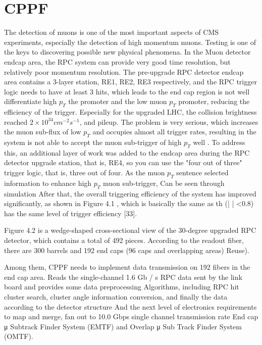 \chapter{CPPF}

The detection of muons is one of the most important aspects of CMS experiments, especially the detection of high momentum muons.
Testing is one of the keys to discovering possible new physical phenomena.
In the Muon detector endcap area, the RPC system can provide very good time resolution, but relatively poor momentum resolution. 
The pre-upgrade RPC detector endcap area contains a 3-layer station, RE1, RE2, RE3 respectively, 
and the RPC trigger logic needs to have at least 3 hits, which leads to the end cap region is 
not well differentiate high $p_T$ the promoter and the low muon $p_T$ promoter, reducing the efficiency of the trigger. Especially for the upgraded LHC, the collision brightness reached $2\times 10^{34}cm^{-2}s^{-1}$, and pileup.
The problem is very serious, which increases the muon sub-flux of low $p_T$ and occupies almost all trigger rates, 
resulting in the system is not able to accept the muon sub-trigger of high $p_T$ well .
To address this, an additional layer of work was added to the endcap area during the RPC detector upgrade station, that is, RE4, so you can use the "four out of three" trigger logic, that is, three out of four. 
As the muon $p_T$ sentence selected information to enhance high $p_T$ muon sub-trigger, Can be seen through simulation
After that, the overall triggering efficiency of the system has improved significantly, as shown in Figure 4.1 , which is basically the same as th (| | <0.8) has the same level of trigger efficiency [33].

Figure 4.2 is a wedge-shaped cross-sectional view of the 30-degree upgraded RPC detector, which contains a total of 492 pieces.
According to the readout fiber, there are 300 barrels and 192 end caps (96 caps and overlapping areas) Reuse).

Among them, CPPF needs to implement data transmission on 192 fibers in the end cap area.
Reads the single-channel 1.6 Gb / s RPC data sent by the link board and provides some data preprocessing
Algorithms, including RPC hit cluster search, cluster angle information conversion, and finally the data according to the detector structure And the next level of electronics requirements to map and merge, fan out to 10.0 Gbps single channel transmission rate
End cap μ Subtrack Finder System (EMTF) and Overlap μ Sub Track Finder System (OMTF).